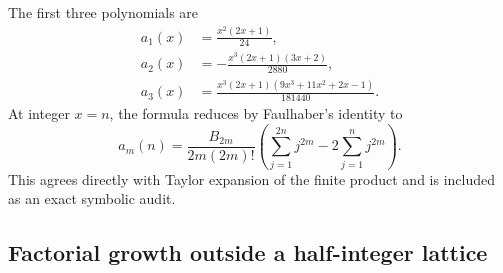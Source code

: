 \documentclass[11pt,a4paper]{article}
\numberwithin{equation}{section}
\theoremstyle{definition}
\begin{document}
The first three polynomials are
\begin{align}
a_1(x)&=\frac{x^2(2x+1)}{24},\label{eq:a1}\\
a_2(x)&=-\frac{x^3(2x+1)(3x+2)}{2880},\label{eq:a2}\\
a_3(x)&=\frac{x^3(2x+1)(9x^3+11x^2+2x-1)}{181440}.
\label{eq:a3}
\end{align}
At integer $x=n$, the formula reduces by Faulhaber's identity to
\[
a_m(n)=\frac{B_{2m}}{2m(2m)!}
\left(\sum_{j=1}^{2n}j^{2m}-2\sum_{j=1}^{n}j^{2m}\right).
\]
This agrees directly with Taylor expansion of the finite product and is included as an exact symbolic audit.

\subsection{Factorial growth outside a half-integer lattice}
\end{document}
